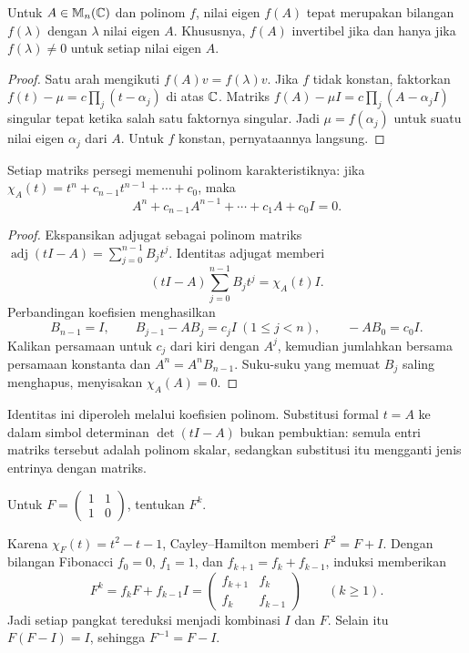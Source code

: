 \begin{prop}
    \label{eigen:spectral-mapping}
    Untuk $A\in\mathbb{M}_n(\mathbb{C})$ dan polinom $f$, nilai eigen $f(A)$
    tepat merupakan bilangan $f(\lambda)$ dengan $\lambda$ nilai eigen $A$.
    Khususnya, $f(A)$ invertibel jika dan hanya jika
    $f(\lambda)\ne0$ untuk setiap nilai eigen $A$.
\end{prop}
\begin{proof}
    Satu arah mengikuti $f(A)v=f(\lambda)v$.
    Jika $f$ tidak konstan, faktorkan
    $f(t)-\mu=c\prod_j(t-\alpha_j)$ di atas $\mathbb{C}$.
    Matriks $f(A)-\mu I=c\prod_j(A-\alpha_jI)$ singular tepat ketika
    salah satu faktornya singular. Jadi $\mu=f(\alpha_j)$ untuk
    suatu nilai eigen $\alpha_j$ dari $A$.
    Untuk $f$ konstan, pernyataannya langsung.
\end{proof}

\begin{teorema}
    Setiap matriks persegi memenuhi polinom karakteristiknya:
    jika $\chi_A(t)=t^n+c_{n-1}t^{n-1}+\cdots+c_0$, maka
    \[
        A^n+c_{n-1}A^{n-1}+\cdots+c_1A+c_0I=0.
    \]
\end{teorema}
\begin{proof}
    Ekspansikan adjugat sebagai polinom matriks
    $\operatorname{adj}(tI-A)=\sum_{j=0}^{n-1}B_jt^j$.
    Identitas adjugat memberi
    \[
        (tI-A)\sum_{j=0}^{n-1}B_jt^j=\chi_A(t)I.
    \]
    Perbandingan koefisien menghasilkan
    \[
        B_{n-1}=I,\qquad B_{j-1}-AB_j=c_jI\ (1\le j<n),
        \qquad -AB_0=c_0I.
    \]
    Kalikan persamaan untuk $c_j$ dari kiri dengan $A^j$, kemudian
    jumlahkan bersama persamaan konstanta dan $A^n=A^nB_{n-1}$.
    Suku-suku yang memuat $B_j$ saling menghapus, menyisakan
    $\chi_A(A)=0$.
\end{proof}

Identitas ini diperoleh melalui koefisien polinom. Substitusi formal
$t=A$ ke dalam simbol determinan $\det(tI-A)$ bukan pembuktian:
semula entri matriks tersebut adalah polinom skalar, sedangkan
substitusi itu mengganti jenis entrinya dengan matriks.

\begin{exam}
    Untuk $F=\begin{pmatrix}1&1\\1&0\end{pmatrix}$, tentukan $F^k$.
\end{exam}
\begin{solution}
    Karena $\chi_F(t)=t^2-t-1$, Cayley--Hamilton memberi $F^2=F+I$.
    Dengan bilangan Fibonacci $f_0=0$, $f_1=1$, dan
    $f_{k+1}=f_k+f_{k-1}$, induksi memberikan
    \[
        F^k=f_kF+f_{k-1}I
        =\begin{pmatrix}f_{k+1}&f_k\\f_k&f_{k-1}\end{pmatrix}
        \qquad(k\ge1).
    \]
    Jadi setiap pangkat tereduksi menjadi kombinasi $I$ dan $F$.
    Selain itu $F(F-I)=I$, sehingga $F^{-1}=F-I$.
\end{solution}

